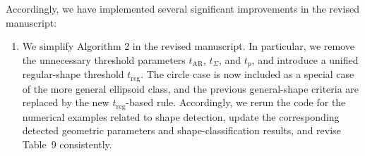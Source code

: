 \documentclass[11pt]{article}
\begin{document}
Accordingly, we have implemented several significant improvements in the revised manuscript:
\begin{enumerate}
    \item We simplify Algorithm 2 in the revised manuscript. In particular, we remove the unnecessary threshold parameters $t_{\text{AR}}$, $t_{\Sigma}$, and $t_p$, and introduce a unified regular-shape threshold $t_{\text{reg}}$. The circle case is now included as a special case of the more general ellipsoid class, and the previous general-shape criteria are replaced by the new $t_{\text{reg}}$-based rule. Accordingly, we rerun the code for the numerical examples related to shape detection, update the corresponding detected geometric parameters and shape-classification results, and revise Table~9 consistently.
    \begin{table}[H]
      \centering
      \caption{Extracted geometric parameters and statistical indicators with $\delta=5\%$ by Algorithm
  3.}
      \label{tab:extracted_parameters}
\end{table}
\end{enumerate}
\end{document}
